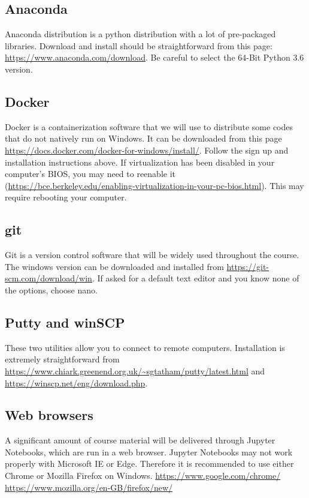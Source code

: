\documentclass[11pt]{article}
\begin{document}
\subsection{Anaconda}

Anaconda distribution is a python distribution with a lot of pre-packaged libraries. 
Download and install should be straightforward from this page: \url{https://www.anaconda.com/download}. 
Be careful to select the 64-Bit Python 3.6 version.

\subsection{Docker}

Docker is a containerization software that we will use to distribute some codes that do not natively run on Windows. 
It can be downloaded from this page \url{https://docs.docker.com/docker-for-windows/install/}. 
Follow the sign up and installation instructions above. If virtualization has been disabled in your computer's BIOS, you may need to reenable it (\url{https://bce.berkeley.edu/enabling-virtualization-in-your-pc-bios.html}). This may require rebooting your computer.

\subsection{git}

Git is a version control software that will be widely used throughout the course. 
The windows version can be downloaded and installed from \url{https://git-scm.com/download/win}. 
If asked for a default text editor and you know none of the options, choose nano.

\subsection{Putty and winSCP}

These two utilities allow you to connect to remote computers. 
Installation is extremely straightforward from 
\url{https://www.chiark.greenend.org.uk/~sgtatham/putty/latest.html} 
and \url{https://winscp.net/eng/download.php}.

\subsection{Web browsers}

A significant amount of course material will be delivered through Jupyter Notebooks, which are run in a web browser. 
Jupyter Notebooks may not work properly with Microsoft IE or Edge. 
Therefore it is recommended to use either Chrome or Mozilla Firefox on Windows.  
\url{https://www.google.com/chrome/}
\url{https://www.mozilla.org/en-GB/firefox/new/} 
\end{document}
